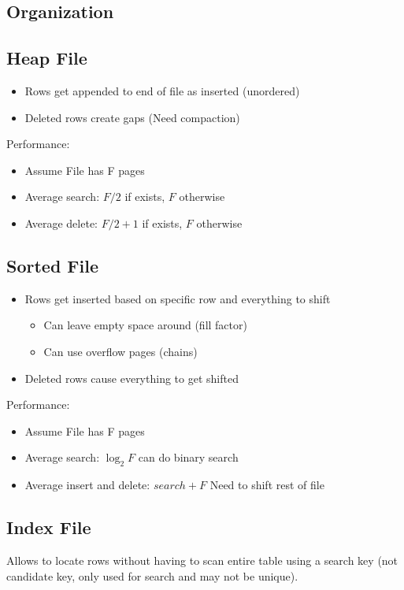 \documentclass[landscape, letterpaper]{extarticle}
\begin{document}
\begin{multicols}{3}
    \section*{Organization}
    \subsection*{Heap File}
    \begin{itemize}[noitemsep,nolistsep]
        \item Rows get appended to end of file as inserted (unordered)
        \item Deleted rows create gaps (Need compaction)
    \end{itemize}
    Performance:
    \begin{itemize}[noitemsep,nolistsep]
        \item Assume File has F pages
        \item Average search: \(F/2\) if exists, \(F\) otherwise
        \item Average delete: \(F/2 + 1\) if exists, \(F\) otherwise
    \end{itemize}
    \subsection*{Sorted File}
    \begin{itemize}[noitemsep,nolistsep]
        \item Rows get inserted based on specific row and everything to shift
              \begin{itemize}[noitemsep,nolistsep]
                  \item Can leave empty space around (fill factor)
                  \item Can use overflow pages (chains)
              \end{itemize}
        \item Deleted rows cause everything to get shifted
    \end{itemize}
    Performance:
    \begin{itemize}[noitemsep,nolistsep]
        \item Assume File has F pages
        \item Average search: \(\log_2 F\) can do binary search
        \item Average insert and delete: \(search + F\) Need to shift rest of file
    \end{itemize}
    \subsection*{Index File}
    Allows to locate rows without having to scan entire table using a search key (not candidate key, only used for search and may not be unique).


\end{multicols}
\end{document}

